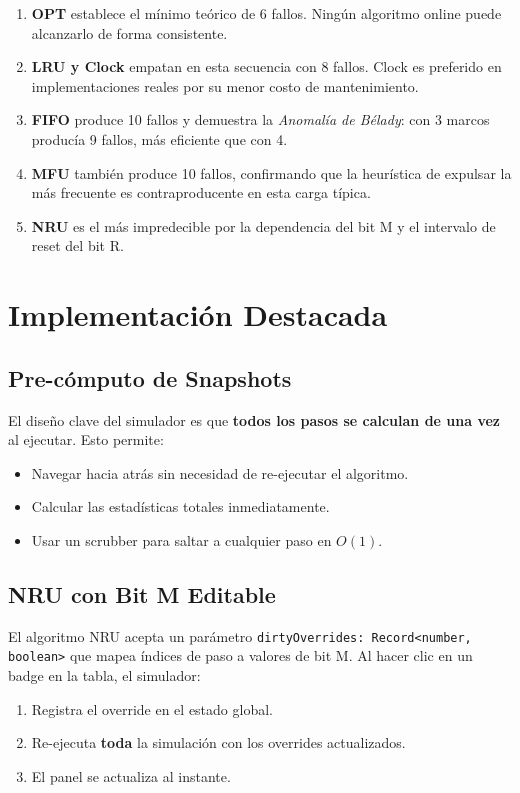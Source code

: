 \documentclass[12pt, a4paper]{article}
\begin{document}
\begin{enumerate}
  \item \textbf{OPT} establece el mínimo teórico de 6 fallos. Ningún algoritmo online puede alcanzarlo de forma consistente.
  \item \textbf{LRU y Clock} empatan en esta secuencia con 8 fallos. Clock es preferido en implementaciones reales por su menor costo de mantenimiento.
  \item \textbf{FIFO} produce 10 fallos y demuestra la \textit{Anomalía de Bélady}: con 3 marcos producía 9 fallos, más eficiente que con 4.
  \item \textbf{MFU} también produce 10 fallos, confirmando que la heurística de expulsar la más frecuente es contraproducente en esta carga típica.
  \item \textbf{NRU} es el más impredecible por la dependencia del bit M y el intervalo de reset del bit R.
\end{enumerate}

\section{Implementación Destacada}

\subsection{Pre-cómputo de Snapshots}

El diseño clave del simulador es que \textbf{todos los pasos se calculan de una vez} al ejecutar. Esto permite:
\begin{itemize}
  \item Navegar hacia atrás sin necesidad de re-ejecutar el algoritmo.
  \item Calcular las estadísticas totales inmediatamente.
  \item Usar un scrubber para saltar a cualquier paso en $O(1)$.
\end{itemize}

\subsection{NRU con Bit M Editable}

El algoritmo NRU acepta un parámetro \texttt{dirtyOverrides: Record<number, boolean>} que mapea índices de paso a valores de bit M. Al hacer clic en un badge en la tabla, el simulador:
\begin{enumerate}
  \item Registra el override en el estado global.
  \item Re-ejecuta \textbf{toda} la simulación con los overrides actualizados.
  \item El panel se actualiza al instante.
\end{enumerate}
\end{document}
